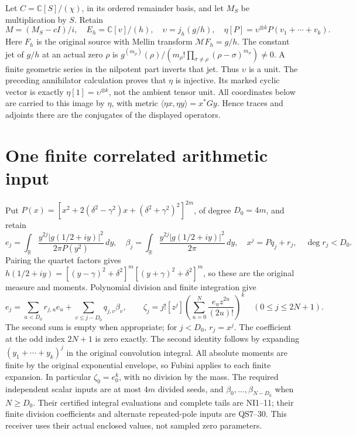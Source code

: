 \documentclass[11pt]{article}
\newcommand{\C}{\mathbb C}\newcommand{\R}{\mathbb R}
\begin{document}
Let \(C=\C[S]/(\chi)\), in its ordered remainder basis, and let
\(M_S\) be multiplication by \(S\). Retain
\begin{equation}\tag{HR2}\label{HR2}
M=(M_S-cI)/i,\quad E_h=\C[v]/(h),\quad
\upsilon=j_h(g/h),\quad
\eta[P]=\upsilon^{\otimes k}P(v_1+\cdots+v_k).
\end{equation}
Here \(F_h\) is the original source with Mellin transform
\(\mathcal M F_h=g/h\). The constant jet of \(g/h\) at an actual zero \(\rho\) is
\(g^{(m_\rho)}(\rho)/(m_\rho!\prod_{\sigma\ne\rho}
(\rho-\sigma)^{m_\sigma})\ne0\). A finite geometric series in the
nilpotent part inverts that jet. Thus \(\upsilon\) is a unit.
The preceding annihilator calculation proves that \(\eta\) is
injective. Its marked cyclic vector is exactly
\(\eta[1]=\upsilon^{\otimes k}\), not the ambient tensor unit.
All coordinates below are carried to this image by \(\eta\), with
metric \(\langle\eta x,\eta y\rangle=x^*Gy\). Hence traces and
adjoints there are the conjugates of the displayed operators.

\section{One finite correlated arithmetic input}

Put \(P(x)=[x^2+2(\delta^2-\gamma^2)x+
(\delta^2+\gamma^2)^2]^{2m}\), of degree \(D_0=4m\), and retain
\begin{equation}\tag{HR3}\label{HR3}
e_j=\int_\R \frac{y^{2j}|g(1/2+iy)|^2}{2\pi P(y^2)}\,dy,
\quad \beta_j=\int_\R \frac{y^{2j}|g(1/2+iy)|^2}{2\pi}\,dy,
\quad x^j=Pq_j+r_j,\quad\deg r_j<D_0.
\end{equation}
Pairing the quartet factors gives \(h(1/2+iy)=
[(y-\gamma)^2+\delta^2]^m[(y+\gamma)^2+\delta^2]^m\), so these
are the original measure and moments. Polynomial division and finite
integration give
\begin{equation}\tag{HR4}\label{HR4}
e_j=\sum_{u<D_0}r_{j,u}e_u+\sum_{v\le j-D_0}q_{j,v}\beta_v,
\qquad
\zeta_j=j![z^j]\left(\sum_{u=0}^N\frac{e_u z^{2u}}{(2u)!}\right)^k
\quad(0\le j\le2N+1).
\end{equation}
The second sum is empty when appropriate; for \(j<D_0\), \(r_j=x^j\).
The coefficient at the odd index \(2N+1\) is zero exactly. The second
identity follows by expanding \((y_1+\cdots+y_k)^j\) in the original
convolution integral. All absolute moments are finite by the original
exponential envelope, so Fubini applies to each finite expansion.
In particular \(\zeta_0=e_0^k\), with no division by the mass.
The required independent scalar inputs are at most \(4m\) divided
seeds, and \(\beta_0,\ldots,\beta_{N-D_0}\) when \(N\ge D_0\).
Their certified integral evaluations and complete tails are NI1--11;
their finite division coefficients and alternate repeated-pole inputs
are QS7--30. This receiver uses their actual enclosed values, not
sampled zero parameters.
\end{document}

